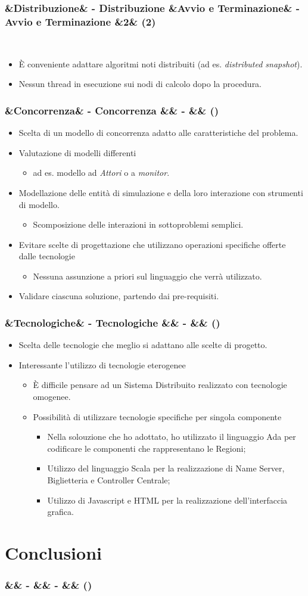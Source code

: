\documentclass[slidestop,compress,blackandwhite]{beamer}
\newcommand{\ii}[1]{\textit{#1}}
\newcommand{\describe}[2]{
	\textbf{#1}\\
	\begin{addmargin}[2em]{0em}
		#2
	\end{addmargin}
}
\newcommand{\newtitle}[4]{
	#1 
	\ifx&#2&%
	\else
  		\large- #2
	\fi
	\ifx&#3&%
	\else
  		\normalsize- #3
	\fi
	\ifx&#4&%
	\else
  		\normalsize (#4)
	\fi
}
\newcommand{\newframe}[5]{
	\begin{frame}
		\frametitle{\newtitle{#1}{#2}{#3}{#4}}
		#5
	\end{frame}
}
\newcommand{\myitemize}[1]{
	\begin{itemize}\itemsep4pt
	#1
	\end{itemize}
}
\begin{document}
	\newframe{}{Distribuzione}{Avvio e Terminazione}{2}{
		\describe{}{
			\myitemize {
				\item \`E conveniente adattare algoritmi noti distribuiti (ad es. \ii{distributed snapshot}).
				\item Nessun thread in esecuzione sui nodi di calcolo dopo la procedura.
			}
		}
	}
	\newframe{}{Concorrenza}{}{}{
		
		\myitemize {
			\item Scelta di un modello di concorrenza adatto alle caratteristiche del problema.
			\item Valutazione di modelli differenti
				\myitemize{
					\item ad es. modello ad \ii{Attori} o a \ii{monitor}.
				}
			\item Modellazione delle entità di simulazione e della loro interazione con strumenti di modello.
				\myitemize {
					\item Scomposizione delle interazioni in sottoproblemi semplici.
				}
			\item Evitare scelte di progettazione che utilizzano operazioni specifiche offerte dalle tecnologie
				\myitemize {
					\item Nessuna assunzione a priori sul linguaggio che verrà utilizzato.
				}
			\item Validare ciascuna soluzione, partendo dai pre-requisiti.
				
		}
		
	}
	
	\newframe{}{Tecnologiche}{}{}{
		\myitemize {
			\item Scelta delle tecnologie che meglio si adattano alle scelte di progetto.
			\item Interessante l'utilizzo di tecnologie eterogenee
				\myitemize {
					\item \`E difficile pensare ad un Sistema Distribuito realizzato con tecnologie omogenee.
					\item Possibilità di utilizzare tecnologie specifiche per singola componente
						\myitemize {
							\item Nella solouzione che ho adottato, ho utilizzato il linguaggio Ada per codificare le componenti che rappresentano le Regioni;
							\item Utilizzo del linguaggio Scala per la realizzazione di Name Server, Biglietteria e Controller Centrale;
							\item Utilizzo di Javascript e HTML per la realizzazione dell'interfaccia grafica.
						}
				}
		}
	}
\section{Conclusioni}\label{conclusions}
	
	\newframe{}{}{}{}{
		
	}
	
\end{document}
